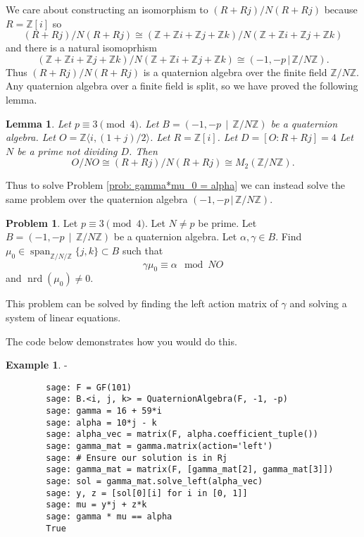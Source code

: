 \documentclass[10pt]{article}
\theoremstyle{plain}
\newtheorem{lemma}[theorem]{Lemma}
\theoremstyle{definition}
\newtheorem{example}[theorem]{Example}
\newtheorem{prob}[theorem]{Problem}
\newcommand{\iso}{\cong}
\newcommand{\op}{\operatorname}
\newcommand{\Z}{\mathbb{Z}}
\newcommand{\nrd}{\op{nrd}}
\begin{document}
We care about constructing an isomorphism to \( (R + Rj) / N(R + Rj) \) because \( R = \Z[i] \) so
\[
    (R + Rj) / N(R + Rj) \iso (\Z + \Z i + \Z j + \Z k) / N (\Z + \Z i + \Z j + \Z k)
\]
and there is a natural isomoprhism
\[
    (\Z + \Z i + \Z j + \Z k) / N (\Z + \Z i + \Z j + \Z k) \iso (-1, -p \, |\, \Z / N \Z).
\]
Thus \( (R + Rj) / N(R + Rj) \) is a quaternion algebra over the finite field \( \Z / N\Z \).
Any quaternion algebra over a finite field is split, so we have proved the following lemma.

\begin{lemma} \label{lem: O / NO isomorphism}
    Let \( p \equiv 3 \pmod{4} \).
    Let \( B =  (-1, -p \, \mid \, \Z / N \Z) \) be a quaternion algebra.
    Let \( O = \Z \langle i, (1+j) / 2 \rangle \).
    Let \( R = \Z[i] \).
    Let \( D =  [O : R + Rj] = 4\)
    Let \( N \) be a prime not dividing \( D \).
    Then
    \[
        O / NO \iso (R + Rj) / N(R + Rj) \iso M_2(\Z / N \Z  ).
    \]
\end{lemma}


Thus to solve Problem \ref{prob: gamma*mu_0 = alpha} we can instead solve the same problem over the quaternion algebra \( ( -1, -p \, |\, \Z / N \Z) \).

\begin{prob}
    Let \( p \equiv 3 \pmod{4} \).
    Let \( N \neq p\) be prime.
    Let \( B =  (-1, -p \, \mid \, \Z / N \Z) \) be a quaternion algebra.
    Let \( \alpha, \gamma \in B \).
    Find \( \mu_0 \in \op{span}_{\Z / N / \Z}\{j, k\} \subset  B \) such that
    \[
        \gamma\mu_0 \equiv \alpha \mod NO
    \]
    and \( \nrd(\mu_0) \neq 0 \).
\end{prob}

This problem can be solved by finding the left action matrix of \( \gamma \) and solving a system of linear equations.

The code below demonstrates how you would do this.

\begin{example}
    -
    \begin{lstlisting}
        sage: F = GF(101)
        sage: B.<i, j, k> = QuaternionAlgebra(F, -1, -p)
        sage: gamma = 16 + 59*i
        sage: alpha = 10*j - k
        sage: alpha_vec = matrix(F, alpha.coefficient_tuple())
        sage: gamma_mat = gamma.matrix(action='left')
        sage: # Ensure our solution is in Rj
        sage: gamma_mat = matrix(F, [gamma_mat[2], gamma_mat[3]])
        sage: sol = gamma_mat.solve_left(alpha_vec)
        sage: y, z = [sol[0][i] for i in [0, 1]]
        sage: mu = y*j + z*k
        sage: gamma * mu == alpha
        True
    \end{lstlisting}
\end{example}
\end{document}
